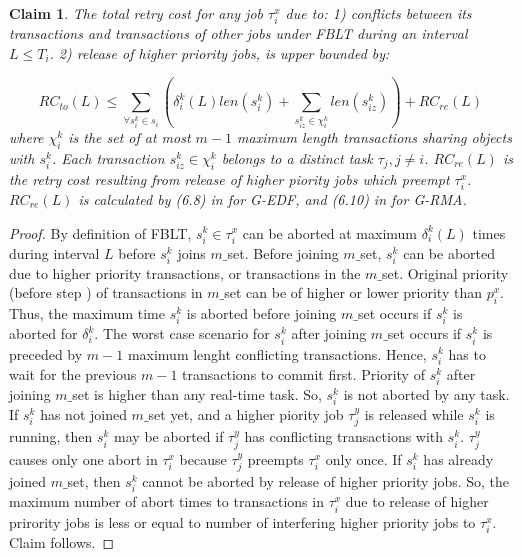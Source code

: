 \documentclass[12pt,english]{report}
\newtheorem{clm}{Claim}
\newtheorem{proof}{Proof}
\begin{document}
\begin{clm}

The total retry cost for any job $\tau_{i}^{x}$ due to: 1) conflicts
between its transactions and transactions of other jobs under FBLT
during an interval $L\le T_{i}$. 2) release of higher priority jobs,
is upper bounded by:

\begin{equation}
RC_{to}(L)\le\sum_{\forall s_{i}^{k}\in s_{i}}\left(\delta_{i}^{k}(L)len(s_{i}^{k})+\sum_{s_{iz}^k\in \chi_i^k} len(s_{iz}^{k})\right)+RC_{re}(L)\label{eq:fblt_rc}
\end{equation} 
where $\chi_i^k$ is the set of at most $m-1$ maximum length transactions sharing objects with $s_i^k$. Each transaction $s_{iz}^k \in \chi_i^k$ belongs to a distinct task $\tau_j, j \ne i$. $RC_{re}(L)$ is the retry cost resulting
from release of higher piority jobs which preempt $\tau_{i}^{x}$.
$RC_{re}(L)$ is calculated by (6.8) in \cite{shambake_phd_proposal}
for G-EDF, and (6.10) in \cite{shambake_phd_proposal} for G-RMA.

\end{clm}

\begin{proof}

By definition of FBLT, $s_{i}^{k}\in\tau_{i}^{x}$ can be aborted
at maximum $\delta_{i}^{k}(L)$ times during interval $L$ before
$s_{i}^{k}$ joins $m\_$set. Before joining $m\_$set, $s_{i}^{k}$
can be aborted due to higher priority transactions, or transactions
in the $m\_$set. Original priority (before step \label{fblt:increase_priority})
of transactions in $m\_$set can be of higher or lower priority than
$p_{i}^{x}$. Thus, the maximum time $s_{i}^{k}$ is aborted before
joining $m\_$set occurs if $s_{i}^{k}$ is aborted for $\delta_{i}^{k}$.
The worst case scenario for $s_{i}^{k}$ after joining $m\_$set occurs
if $s_{i}^{k}$ is preceded by $m-1$ maximum lenght conflicting transactions.
Hence, $s_{i}^{k}$ has to wait for the previous $m-1$ transactions
to commit first. Priority of $s_{i}^{k}$ after joining $m\_$set
is higher than any real-time task. So, $s_{i}^{k}$ is not aborted
by any task. If $s_{i}^{k}$ has not joined $m\_$set yet, and a higher
piority job $\tau_{j}^{y}$ is released while $s_{i}^{k}$ is running,
then $s_{i}^{k}$ may be aborted if $\tau_{j}^{y}$ has conflicting
transactions with $s_{i}^{k}$. $\tau_{j}^{y}$ causes only one abort
in $\tau_{i}^{x}$ because $\tau_{j}^{y}$ preempts $\tau_{i}^{x}$
only once. If $s_{i}^{k}$ has already joined $m\_$set, then $s_{i}^{k}$
cannot be aborted by release of higher priority jobs. So, the maximum
number of abort times to transactions in $\tau_{i}^{x}$ due to release
of higher prirority jobs is less or equal to number of interfering
higher priority jobs to $\tau_{i}^{x}$. Claim follows.

\end{proof}
\end{document}
